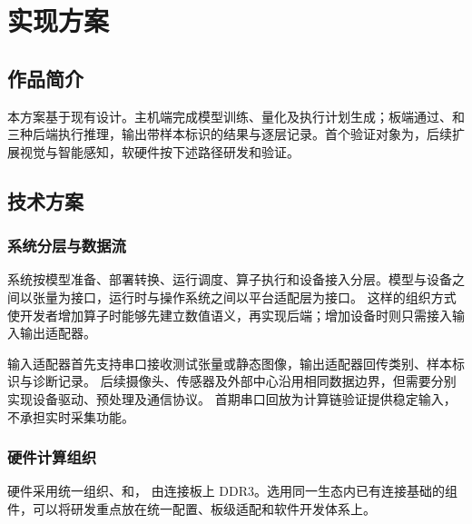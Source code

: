 \section{实现方案}
\subsection{作品简介}
本方案基于现有\BoardModel{}设计\RuntimeName{}。主机端完成模型训练、量化及执行计划生成；板端通过\ProcessorCore{}、\VectorUnit{}和\AcceleratorName{}三种后端执行推理，输出带样本标识的结果与逐层记录。首个验证对象为\AIModel{}，后续扩展视觉与智能感知，软硬件按下述路径研发和验证。

\subsection{技术方案}
\subsubsection{系统分层与数据流}
\begin{figure}[H]
\centering

\caption{\SoftwareArchitectureCaption}
\label{fig:software}
\end{figure}

系统按模型准备、部署转换、运行调度、算子执行和设备接入分层。模型与设备之间以张量为接口，运行时与操作系统之间以平台适配层为接口。
这样的组织方式使开发者增加算子时能够先建立数值语义，再实现后端；增加设备时则只需接入输入输出适配器。

输入适配器首先支持串口接收测试张量或静态图像，输出适配器回传类别、样本标识与诊断记录。
后续摄像头、传感器及外部中心沿用相同数据边界，但需要分别实现设备驱动、预处理及通信协议。
首期串口回放为计算链验证提供稳定输入，不承担实时采集功能。

\subsubsection{硬件计算组织}
硬件采用\IntegrationFramework{}统一组织\ProcessorCore{}、\VectorUnit{}和\AcceleratorName{}，
由\MemoryController{}连接板上 DDR3。选用同一生态内已有连接基础的组件，可以将研发重点放在统一配置、板级适配和软件开发体系上。\cite{rocket,saturn,gemmini,chipyard,litedram}

\begin{figure}[H]
\centering

\caption{\HardwareArchitectureCaption}
\label{fig:hardware}
\end{figure}

